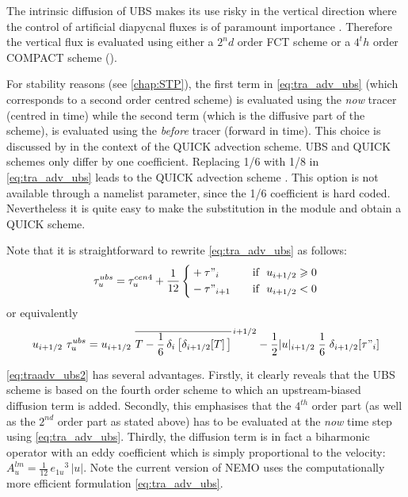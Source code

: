 \documentclass[../tex_main/NEMO_manual]{subfiles}
\begin{document}
The intrinsic diffusion of UBS makes its use risky in the vertical direction where
the control of artificial diapycnal fluxes is of paramount importance
\citep{Shchepetkin_McWilliams_OM05, Demange_PhD2014}.
Therefore the vertical flux is evaluated using either a $2^nd$ order FCT scheme or a $4^th$ order COMPACT scheme
().

For stability reasons (see \autoref{chap:STP}), the first term  in \autoref{eq:tra_adv_ubs}
(which corresponds to a second order centred scheme)
is evaluated using the \textit{now} tracer (centred in time) while the second term
(which is the diffusive part of the scheme),
is evaluated using the \textit{before} tracer (forward in time).
This choice is discussed by \citet{Webb_al_JAOT98} in the context of the QUICK advection scheme.
UBS and QUICK schemes only differ by one coefficient.
Replacing 1/6 with 1/8 in \autoref{eq:tra_adv_ubs} leads to the QUICK advection scheme \citep{Webb_al_JAOT98}.
This option is not available through a namelist parameter, since the 1/6 coefficient is hard coded.
Nevertheless it is quite easy to make the substitution in the  module and obtain a QUICK scheme.

Note that it is straightforward to rewrite \autoref{eq:tra_adv_ubs} as follows:
\begin{equation} \label{eq:traadv_ubs2}
\tau _u^{ubs} = \tau _u^{cen4} + \frac{1}{12} \left\{	 
   \begin{aligned}
	& + \tau"_i			& \quad \text{if }\ u_{i+1/2} \geqslant 0 \\
	&  - \tau"_{i+1}		& \quad \text{if }\ u_{i+1/2}       <       0
   \end{aligned}    \right.
\end{equation}
or equivalently 
\begin{equation} \label{eq:traadv_ubs2b}
u_{i+1/2} \ \tau _u^{ubs} 
=u_{i+1/2} \ \overline{ T - \frac{1}{6}\,\delta _i\left[ \delta_{i+1/2}[T] \,\right] }^{\,i+1/2}
- \frac{1}{2} |u|_{i+1/2} \;\frac{1}{6} \;\delta_{i+1/2}[\tau"_i]
\end{equation}

\autoref{eq:traadv_ubs2} has several advantages.
Firstly, it clearly reveals that the UBS scheme is based on the fourth order scheme to which
an upstream-biased diffusion term is added.
Secondly, this emphasises that the $4^{th}$ order part (as well as the $2^{nd}$ order part as stated above) has to
be evaluated at the \emph{now} time step using \autoref{eq:tra_adv_ubs}.
Thirdly, the diffusion term is in fact a biharmonic operator with an eddy coefficient which
is simply proportional to the velocity:
$A_u^{lm}= \frac{1}{12}\,{e_{1u}}^3\,|u|$.
Note the current version of NEMO uses the computationally more efficient formulation \autoref{eq:tra_adv_ubs}.
\end{document}
